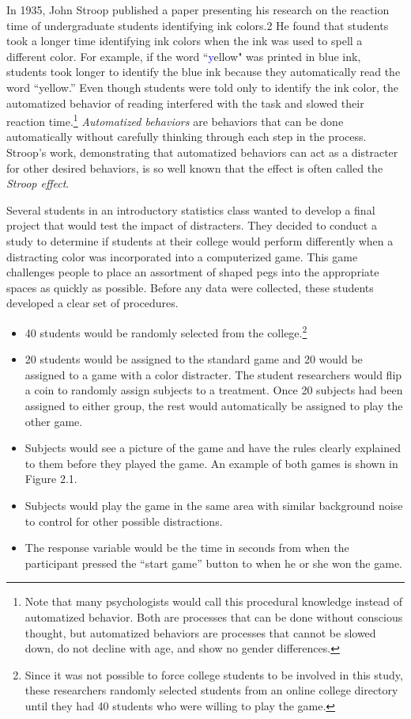 \documentclass[
]{book}
\providecommand{\tightlist}{%
  \setlength{\itemsep}{0pt}\setlength{\parskip}{0pt}}
\begin{document}
In 1935, John Stroop published a paper presenting his research on the reaction time of undergraduate students identifying ink colors.2 He found that students took a longer time identifying ink colors when the ink was used to spell a different color. For example, if the word ``\textcolor{blue}yellow\textcolor{black}" was printed in blue ink, students took longer to identify the blue ink because they automatically read the word ``yellow.'' Even though students were told only to identify the ink color, the automatized behavior of reading interfered with the task and slowed their reaction time.\footnote{Note that many psychologists would call this procedural knowledge instead of automatized behavior. Both are processes that can be done without conscious thought, but automatized behaviors are processes that cannot be slowed down, do not
  decline with age, and show no gender differences.} \emph{Automatized behaviors} are behaviors that can be done automatically without carefully thinking through each step in the process. Stroop's work, demonstrating that automatized behaviors can act as a distracter for other desired behaviors, is so well known that the effect is often called the \emph{Stroop effect}.

Several students in an introductory statistics class wanted to develop a final project that would test the impact of distracters. They decided to conduct a study to determine if students at their college would perform differently when a distracting color was incorporated into a computerized game. This game challenges people to place an assortment of shaped pegs into the appropriate spaces as quickly as possible. Before any data were collected, these students developed a clear set of procedures.

\begin{itemize}
\tightlist
\item
  40 students would be randomly selected from the college.\footnote{Since it was not possible to force college students to be involved in this study, these researchers randomly selected students from an online college directory until they had 40 students who were willing to play the game.}
\item
  20 students would be assigned to the standard game and 20 would be assigned to a game with a color
  distracter. The student researchers would flip a coin to randomly assign subjects to a treatment. Once
  20 subjects had been assigned to either group, the rest would automatically be assigned to play the
  other game.
\item
  Subjects would see a picture of the game and have the rules clearly explained to them before they
  played the game. An example of both games is shown in Figure 2.1.
\item
  Subjects would play the game in the same area with similar background noise to control for other
  possible distractions.
\item
  The response variable would be the time in seconds from when the participant pressed the ``start
  game'' button to when he or she won the game.
\end{itemize}
\end{document}

